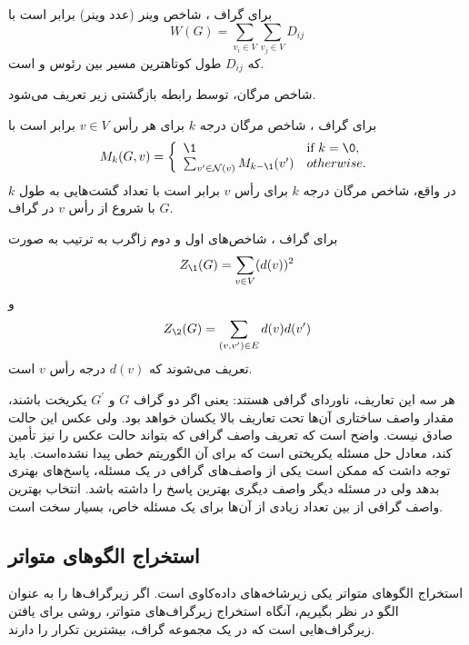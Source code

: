 \begin{definition}
برای گراف ، شاخص وینر (عدد وینر) برابر است با
\begin{equation*}
W(G) = \sum_{v_i\in V}\sum_{v_j\in V} D_{ij}
\end{equation*}
که $D_{ij}$ طول کوتاهترین مسیر بین رئوس \Vi و \Vj است.
\end{definition}

شاخص مرگان، توسط رابطه بازگشتی زیر تعریف می‌شود.
\begin{definition}
برای گراف ، شاخص مرگان درجه $k$ برای هر رأس $v \in V$ برابر است با
\begin{equation*}
M_k(G,v) = 
\left\{
	\begin{array}{ll}
		\1  & \mbox{if } k = \0, \\
		{\sum_{v^\prime\in \mN(v)}M_{k-\1}(v^\prime)} & otherwise.
	\end{array}
\right.
\end{equation*}
در واقع، شاخص مرگان درجه $k$ برای رأس $v$ برابر است با تعداد گشت‌هایی به طول $k$ با شروع از رأس $v$ در گراف $G$.
\end{definition}

\begin{definition}
برای گراف ، شاخص‌های اول و دوم زاگرب به ترتیب به صورت
\begin{equation*}
Z_\1(G) = \sum_{v\in V}(d(v))^2
\end{equation*}
و
\begin{equation*}
Z_\2(G) = \sum_{(v,v^\prime)\in E}d(v)d(v^\prime)
\end{equation*}
تعریف می‌شوند که $d(v)$ درجه رأس $v$ است.
\end{definition}

هر سه این تعاریف، ناوردای گرافی هستند: یعنی اگر دو گراف $G$ و $G^\prime$ یکریخت باشند، مقدار واصف ساختاری آن‌ها تحت تعاریف بالا یکسان خواهد بود. ولی عکس این حالت صادق نیست. واضح است که تعریف واصف گرافی که بتواند حالت عکس را نیز تأمین کند، معادل حل مسئله یکریختی است که برای آن الگوریتم خطی پیدا نشده‌است.  باید توجه داشت که ممکن است یکی از واصف‌های گرافی در یک مسئله، پاسخ‌های بهتری بدهد ولی در مسئله دیگر واصف دیگری بهترین پاسخ را داشته باشد. انتخاب بهترین واصف گرافی از بین تعداد زیادی از آن‌ها برای یک مسئله خاص، بسیار سخت است.
\subsection{استخراج الگو‌های متواتر}
استخراج الگوهای متواتر یکی زیرشاخه‌های داده‌کاوی است. اگر زیرگراف‌ها را به عنوان الگو در نظر بگیریم، آنگاه استخراج زیرگراف‌های متواتر، روشی برای یافتن زیرگراف‌هایی است که در یک مجموعه گراف، بیشترین تکرار را دارند.

